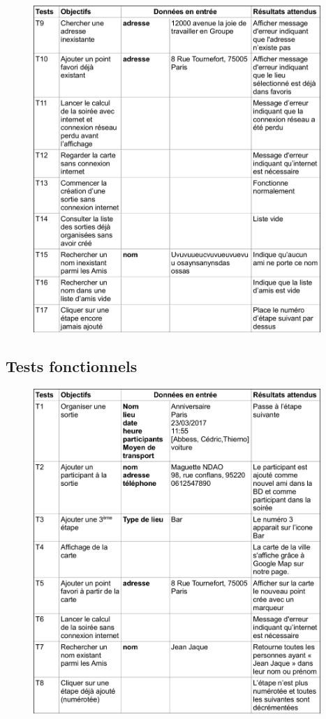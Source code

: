 \documentclass[a4paper, 12pt, notitlepage]{article} %
\begin{document}
\begin{figure}[!htb]
    \centering
    \includegraphics[width=0.97\textwidth]{tests_unitaires_2.png}
\end{figure}
\clearpage

\subsection{Tests fonctionnels}
\begin{figure}[!htb]
    \centering
    \includegraphics[width=0.97\textwidth]{tests_fonctionels.png}
\end{figure}
\clearpage
\end{document}
